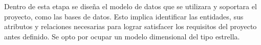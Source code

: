 Dentro de esta etapa se diseña el modelo de datos que se utilizara y soportara el proyecto, como las bases de datos. Esto implica identificar las entidades, sus atributos y relaciones necesarias para lograr satisfacer los requisitos del proyecto antes definido. Se opto por ocupar un modelo dimensional del tipo estrella.

